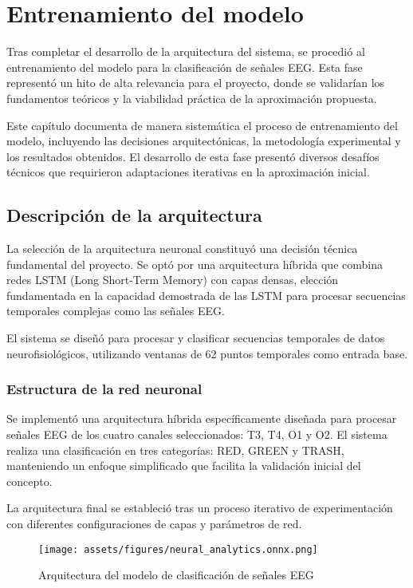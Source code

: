 \chapter{Entrenamiento del modelo}\label{ch:model_training}

Tras completar el desarrollo de la arquitectura del sistema, se procedió al entrenamiento del modelo para la clasificación de señales EEG. Esta fase representó un hito de alta relevancia para el proyecto, donde se validarían los fundamentos teóricos y la viabilidad práctica de la aproximación propuesta.

Este capítulo documenta de manera sistemática el proceso de entrenamiento del modelo, incluyendo las decisiones arquitectónicas, la metodología experimental y los resultados obtenidos. El desarrollo de esta fase presentó diversos desafíos técnicos que requirieron adaptaciones iterativas en la aproximación inicial.

\section{Descripción de la arquitectura}

La selección de la arquitectura neuronal constituyó una decisión técnica fundamental del proyecto. Se optó por una arquitectura híbrida que combina redes LSTM (Long Short-Term Memory) con capas densas, elección fundamentada en la capacidad demostrada de las LSTM para procesar secuencias temporales complejas como las señales EEG.

El sistema se diseñó para procesar y clasificar secuencias temporales de datos neurofisiológicos, utilizando ventanas de 62 puntos temporales como entrada base.

\subsection{Estructura de la red neuronal}

Se implementó una arquitectura híbrida específicamente diseñada para procesar señales EEG de los cuatro canales seleccionados: T3, T4, O1 y O2. El sistema realiza una clasificación en tres categorías: RED, GREEN y TRASH, manteniendo un enfoque simplificado que facilita la validación inicial del concepto.

La arquitectura final se estableció tras un proceso iterativo de experimentación con diferentes configuraciones de capas y parámetros de red.

\begin{figure}[ht]
    \centering
    \texttt{[image: assets/figures/neural\_analytics.onnx.png]}
    \caption{Arquitectura del modelo de clasificación de señales EEG}
    \label{fig:model_architecture}
\end{figure}

